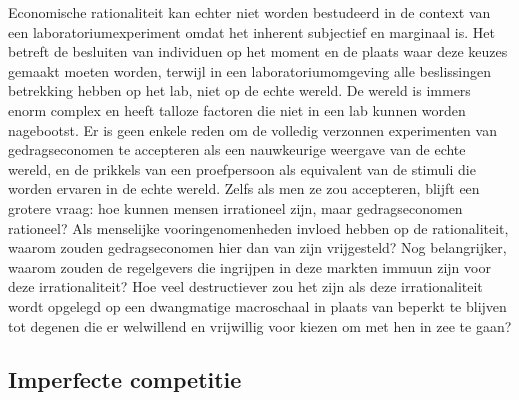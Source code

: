 Economische rationaliteit kan echter niet worden bestudeerd in de context van een laboratoriumexperiment omdat het inherent subjectief en marginaal is. Het betreft de besluiten van individuen op het moment en de plaats waar deze keuzes gemaakt moeten worden, terwijl in een laboratoriumomgeving alle beslissingen betrekking hebben op het lab, niet op de echte wereld. De wereld is immers enorm complex en heeft talloze factoren die niet in een lab kunnen worden nagebootst. Er is geen enkele reden om de volledig verzonnen experimenten van gedragseconomen te accepteren als een nauwkeurige weergave van de echte wereld, en de prikkels van een proefpersoon als equivalent van de stimuli die worden ervaren in de echte wereld. Zelfs als men ze zou accepteren, blijft een grotere vraag: hoe kunnen mensen irrationeel zijn, maar gedragseconomen rationeel? Als menselijke vooringenomenheden invloed hebben op de rationaliteit, waarom zouden gedragseconomen hier dan van zijn vrijgesteld? Nog belangrijker, waarom zouden de regelgevers die ingrijpen in deze markten immuun zijn voor deze irrationaliteit? Hoe veel destructiever zou het zijn als deze irrationaliteit wordt opgelegd op een dwangmatige macroschaal in plaats van beperkt te blijven tot degenen die er welwillend en vrijwillig voor kiezen om met hen in zee te gaan?

\subsection{Imperfecte competitie}

